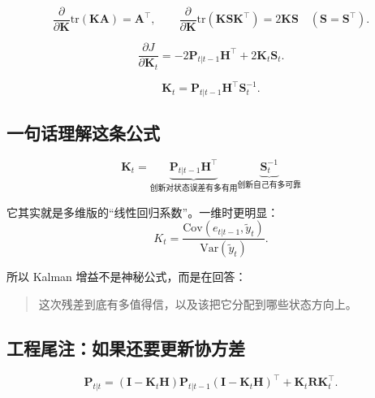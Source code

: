 
\[
\frac{\partial}{\partial \bm{K}}
\mathrm{tr}(\bm{K}\bm{A})
= \bm{A}^\top,
\qquad
\frac{\partial}{\partial \bm{K}}
\mathrm{tr}(\bm{K}\bm{S}\bm{K}^\top)
= 2\bm{K}\bm{S}
\quad(\bm{S}=\bm{S}^\top).
\]


\[
\frac{\partial J}{\partial \bm{K}_t}
= -2\bm{P}_{t|t-1}\bm{H}^\top + 2\bm{K}_t\bm{S}_t.
\]


\[
\bm{K}_t
= \bm{P}_{t|t-1}\bm{H}^\top\bm{S}_t^{-1}.
\]

\subsection{一句话理解这条公式}

\[
\bm{K}_t
=
\underbrace{\bm{P}_{t|t-1}\bm{H}^\top}_{\text{创新对状态误差有多有用}}
\underbrace{\bm{S}_t^{-1}}_{\text{创新自己有多可靠}}
\]

它其实就是多维版的“线性回归系数”。一维时更明显：
\[
K_t
= \frac{\mathrm{Cov}(e_{t|t-1},\tilde{y}_t)}{\mathrm{Var}(\tilde{y}_t)}.
\]

所以 Kalman 增益不是神秘公式，而是在回答：

\begin{quote}
这次残差到底有多值得信，以及该把它分配到哪些状态方向上。
\end{quote}

\subsection{工程尾注：如果还要更新协方差}



\[
\bm{P}_{t|t}
= (\bm{I} - \bm{K}_t\bm{H})\bm{P}_{t|t-1}(\bm{I} - \bm{K}_t\bm{H})^\top
+ \bm{K}_t\bm{R}\bm{K}_t^\top.
\]

